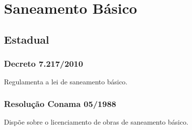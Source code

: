 \section{Saneamento Básico}

\begin{subapend}
	\subsection{Estadual}
	\begin{subsubapend}
		\subsubsection{Decreto 7.217/2010}
		Regulamenta a lei de saneamento básico.
		\subsubsection{Resolução Conama 05/1988}
		Dispõe sobre o licenciamento de obras de saneamento básico.
	\end{subsubapend}
\end{subapend}
